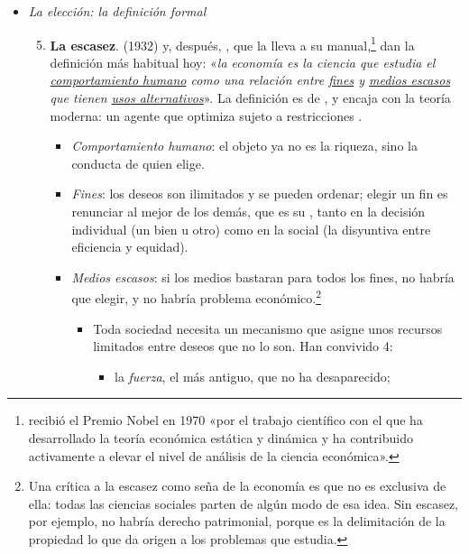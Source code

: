 \documentclass[11pt]{article}
\begin{document}
\begin{itemize}
\begin{enumerate}
\begin{itemize}
    \item \emph{Requisitos materiales del bienestar}: la economía mira a los medios materiales de la vida buena, sin dejar de ser una ciencia de lo que es.
    \end{itemize}
  \end{enumerate}
\item \emph{La elección: la definición formal}
  \begin{enumerate}\setcounter{enumi}{4}
  \item \textbf{La escasez}.  (1932) y, después, , que la lleva a su manual,\footnote{ recibió el Premio Nobel en 1970 «por el trabajo científico con el que ha desarrollado la teoría económica estática y dinámica y ha contribuido activamente a elevar el nivel de análisis de la ciencia económica»\nocite{Nobel1970Samuelson}.} dan la definición más habitual hoy: «\emph{la economía es la ciencia que estudia el \uline{comportamiento humano} como una relación entre \uline{fines} y \uline{medios escasos} que tienen \uline{usos alternativos}}»\nocite{Robbins1932Essay}. La definición es de , y encaja con la teoría moderna: un agente que optimiza sujeto a restricciones .
    \begin{itemize}
    \item \emph{Comportamiento humano}: el objeto ya no es la riqueza, sino la conducta de quien elige.
    \item \emph{Fines}: los deseos son ilimitados y se pueden ordenar; elegir un fin es renunciar al mejor de los demás, que es su , tanto en la decisión individual (un bien u otro) como en la social (la disyuntiva entre eficiencia y equidad).
    \item \emph{Medios escasos}: si los medios bastaran para todos los fines, no habría que elegir, y no habría problema económico.\footnote{Una crítica a la escasez como seña de la economía es que no es exclusiva de ella: todas las ciencias sociales parten de algún modo de esa idea. Sin escasez, por ejemplo, no habría derecho patrimonial, porque es la delimitación de la propiedad lo que da origen a los problemas que estudia.}
      \begin{itemize}
      \item Toda sociedad necesita un mecanismo que asigne unos recursos limitados entre deseos que no lo son. Han convivido 4:
        \begin{itemize}
        \item la \emph{fuerza}, el más antiguo, que no ha desaparecido;

\end{itemize}
\end{itemize}
\end{itemize}
\end{enumerate}
\end{itemize}
\end{document}
